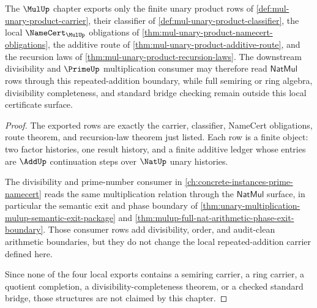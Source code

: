 \begin{theorem}
\label{thm:mul-unary-product-finite-data-boundary}
The $\MulUp$ chapter exports only the finite unary product rows of \autoref{def:mul-unary-product-carrier}, their classifier of \autoref{def:mul-unary-product-classifier}, the local $\NameCert_{\MulUp}$ obligations of \autoref{thm:mul-unary-product-namecert-obligations}, the additive route of \autoref{thm:mul-unary-product-additive-route}, and the recursion laws of \autoref{thm:mul-unary-product-recursion-laws}. The downstream divisibility and $\PrimeUp$ multiplication consumer may therefore read $\mathsf{NatMul}$ rows through this repeated-addition boundary, while full semiring or ring algebra, divisibility completeness, and standard bridge checking remain outside this local certificate surface.
\end{theorem}
\begin{proof}
The exported rows are exactly the carrier, classifier, NameCert obligations, route theorem, and recursion-law theorem just listed. Each row is a finite object: two factor histories, one result history, and a finite additive ledger whose entries are $\AddUp$ continuation steps over $\NatUp$ unary histories.

The divisibility and prime-number consumer in \autoref{ch:concrete-instances-prime-namecert} reads the same multiplication relation through the $\mathsf{NatMul}$ surface, in particular the semantic exit and phase boundary of \autoref{thm:unary-multiplication-mulup-semantic-exit-package} and \autoref{thm:mulup-full-nat-arithmetic-phase-exit-boundary}. Those consumer rows add divisibility, order, and audit-clean arithmetic boundaries, but they do not change the local repeated-addition carrier defined here.

Since none of the four local exports contains a semiring carrier, a ring carrier, a quotient completion, a divisibility-completeness theorem, or a checked standard bridge, those structures are not claimed by this chapter.
\end{proof}

